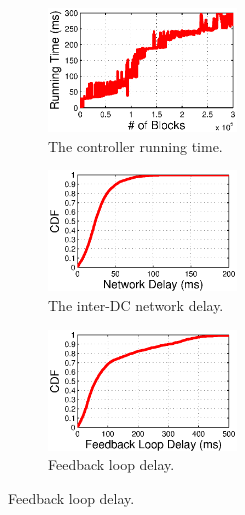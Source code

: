 \begin{figure}[t]
        \centering
        \begin{subfigure}[b]{0.3\textwidth}
                \centering
                \includegraphics[width=50mm]{images/CPUvsBlk.eps}%
                \caption{The controller running time.}
                \label{fig:scale:cpu}
        \end{subfigure}
        \begin{subfigure}[b]{0.3\textwidth}
                \centering
                \includegraphics[width=50mm]{images/NetworkDelay.eps}%
                \caption{The inter-DC network delay.}
                \label{fig:scale:network}
        \end{subfigure}
        \begin{subfigure}[b]{0.3\textwidth}
                \centering
                \includegraphics[width=50mm]{images/CDFofFeedbackLoopDelay.eps}
                \caption{Feedback loop delay.}
                \label{fig:scale:feedback}
        \end{subfigure}
        \label{fig:scale}
\vspace{-0.4cm}
\end{figure}

